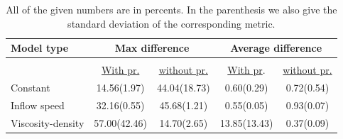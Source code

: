 \documentclass{llncs}
\begin{document}
\begin{table}
  \begin{center}
    \begin{tabular}{lcc|cc}
      \textbf{Model type} & \multicolumn{2}{c|}{\textbf{Max difference}}  &  \multicolumn{2}{c}{\textbf{Average difference}}\\
      \hline 
      \multicolumn{3}{c|}{}&&\\
                 & \underline{With pr.} & \underline{without pr.}  &  \underline{With pr}.& \underline{without pr.}\\
      
      Constant           &14.56(1.97)&44.04(18.73)&0.60(0.29)&0.72(0.54)  \\
      Inflow speed       &32.16(0.55)&45.68(1.21)&0.55(0.05)&0.93(0.07)   \\
      Viscosity-density  &57.00(42.46)&14.70(2.65)&13.85(13.43)&0.37(0.09)\\
    \end{tabular}
  \end{center}
  \caption{All of the given numbers are in percents. In the parenthesis we also give the standard deviation of the corresponding metric.}\label{tab:single}
\end{table}
\end{document}
